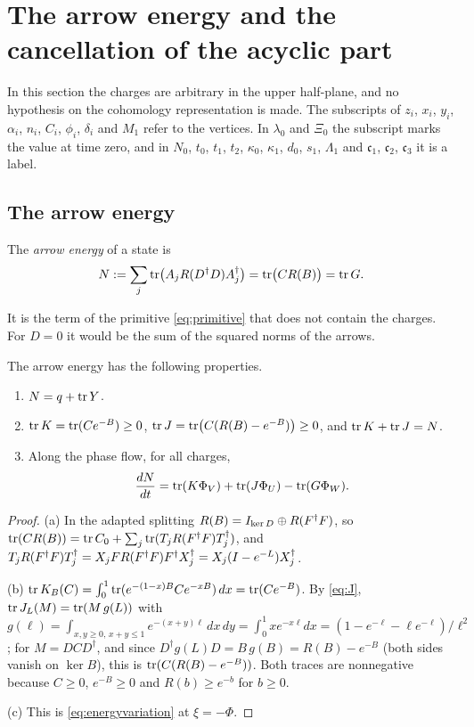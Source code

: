 \section{The arrow energy and the cancellation of the acyclic part}\label{sec:energy}

In this section the charges are arbitrary in the upper half-plane, and no
hypothesis on the cohomology representation is made. The subscripts of
$z_i$, $x_i$, $y_i$, $\alpha_i$, $n_i$, $C_i$, $\phi_i$, $\delta_i$ and $M_1$
refer to the vertices. In $\lambda_0$ and
$\Xi_0$ the subscript marks the value at time zero, and in $N_0$, $t_0$,
$t_1$, $t_2$, $\kappa_0$, $\kappa_1$, $d_0$, $s_1$, $\Lambda_1$ and
$\mathfrak c_1$, $\mathfrak c_2$, $\mathfrak c_3$ it is a label.

\subsection{The arrow energy}

\begin{definition}\label{def:energy}
The \emph{arrow energy} of a state is
\[
 N:=\sum_j\operatorname{tr}\bigl(A_jR(D^\dagger D)A_j^\dagger\bigr)=\operatorname{tr}\bigl(CR(B)\bigr)=\operatorname{tr} G .
\]
\end{definition}

It is the term of the primitive \eqref{eq:primitive} that does not contain
the charges. For $D=0$ it would be the sum of the squared norms of the
arrows.

\begin{lemma}\label{lem:energy}
The arrow energy has the following properties.
\begin{enumerate}
\item[(a)] $N=q+\operatorname{tr} Y$.
\item[(b)] $\operatorname{tr} K=\operatorname{tr}(Ce^{-B})\geq0$,
 $\operatorname{tr} J=\operatorname{tr}\bigl(C(R(B)-e^{-B})\bigr)\geq0$, and $\operatorname{tr} K+\operatorname{tr} J=N$.
\item[(c)] Along the phase flow, for all charges,
 \[
 \frac{dN}{dt}=\operatorname{tr}(K\Phi_V)+\operatorname{tr}(J\Phi_U)-\operatorname{tr}(G\Phi_W).
 \]
\end{enumerate}
\end{lemma}

\begin{proof}
(a) In the adapted splitting $R(B)=I_{\ker D}\oplus R(F^\dagger F)$, so
$\operatorname{tr}(CR(B))=\operatorname{tr} C_0+\sum_j\operatorname{tr}(T_jR(F^\dagger F)T_j^\dagger)$, and
$T_jR(F^\dagger F)T_j^\dagger=X_jFR(F^\dagger F)F^\dagger X_j^\dagger
=X_j(I-e^{-L})X_j^\dagger$.

(b) $\operatorname{tr} K_B(C)=\int_0^1\operatorname{tr}(e^{-(1-x)B}Ce^{-xB})\,dx=\operatorname{tr}(Ce^{-B})$. By
\eqref{eq:J}, $\operatorname{tr} J_L(M)=\operatorname{tr}(M\,g(L))$ with
$g(\ell)=\int_{x,y\geq0,\,x+y\leq1}e^{-(x+y)\ell}\,dx\,dy
=\int_0^1xe^{-x\ell}dx=(1-e^{-\ell}-\ell e^{-\ell})/\ell^2$; for
$M=DCD^\dagger$, and since $D^\dagger g(L)D=B\,g(B)=R(B)-e^{-B}$ (both sides
vanish on $\ker B$), this is $\operatorname{tr}(C(R(B)-e^{-B}))$. Both traces are
nonnegative because $C\geq0$, $e^{-B}\geq0$ and $R(b)\geq e^{-b}$ for
$b\geq0$.

(c) This is \eqref{eq:energyvariation} at $\xi=-\Phi$.
\end{proof}

